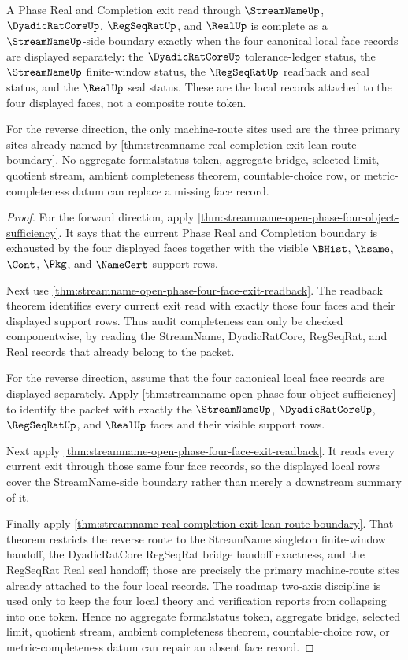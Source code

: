 \begin{theorem}
\label{thm:streamname-open-phase-facewise-record-completeness}
A Phase Real and Completion exit read through $\StreamNameUp$, $\DyadicRatCoreUp$, $\RegSeqRatUp$, and $\RealUp$ is complete as a $\StreamNameUp$-side boundary exactly when the four canonical local face records are displayed separately: the $\DyadicRatCoreUp$ tolerance-ledger status, the $\StreamNameUp$ finite-window status, the $\RegSeqRatUp$ readback and seal status, and the $\RealUp$ seal status. These are the local records attached to the four displayed faces, not a composite route token.

For the reverse direction, the only machine-route sites used are the three primary sites already named by \autoref{thm:streamname-real-completion-exit-lean-route-boundary}. No aggregate formalstatus token, aggregate bridge, selected limit, quotient stream, ambient completeness theorem, countable-choice row, or metric-completeness datum can replace a missing face record.
\end{theorem}
\begin{proof}
For the forward direction, apply \autoref{thm:streamname-open-phase-four-object-sufficiency}. It says that the current Phase Real and Completion boundary is exhausted by the four displayed faces together with the visible $\BHist$, $\hsame$, $\Cont$, $\Pkg$, and $\NameCert$ support rows.

Next use \autoref{thm:streamname-open-phase-four-face-exit-readback}. The readback theorem identifies every current exit read with exactly those four faces and their displayed support rows. Thus audit completeness can only be checked componentwise, by reading the StreamName, DyadicRatCore, RegSeqRat, and Real records that already belong to the packet.

For the reverse direction, assume that the four canonical local face records are displayed separately. Apply \autoref{thm:streamname-open-phase-four-object-sufficiency} to identify the packet with exactly the $\StreamNameUp$, $\DyadicRatCoreUp$, $\RegSeqRatUp$, and $\RealUp$ faces and their visible support rows.

Next apply \autoref{thm:streamname-open-phase-four-face-exit-readback}. It reads every current exit through those same four face records, so the displayed local rows cover the StreamName-side boundary rather than merely a downstream summary of it.

Finally apply \autoref{thm:streamname-real-completion-exit-lean-route-boundary}. That theorem restricts the reverse route to the StreamName singleton finite-window handoff, the DyadicRatCore RegSeqRat bridge handoff exactness, and the RegSeqRat Real seal handoff; those are precisely the primary machine-route sites already attached to the four local records. The roadmap two-axis discipline is used only to keep the four local theory and verification reports from collapsing into one token. Hence no aggregate formalstatus token, aggregate bridge, selected limit, quotient stream, ambient completeness theorem, countable-choice row, or metric-completeness datum can repair an absent face record.
\end{proof}

